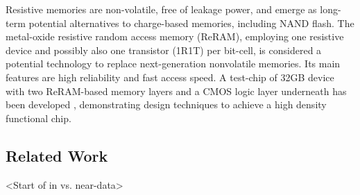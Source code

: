 \documentclass{superfri}
\begin{document}
Resistive memories are non-volatile, free of leakage power, and emerge as long-term potential alternatives to charge-based memories, including NAND flash. The metal-oxide resistive random access memory (ReRAM), employing one resistive device and possibly also one transistor (1R1T) per bit-cell, is considered a potential technology to replace next-generation nonvolatile memories. Its main features are high reliability and fast access speed. A test-chip of 32GB device with two ReRAM-based memory layers and a CMOS logic layer underneath has been developed \cite{ahn2015pim}, demonstrating design techniques to achieve a high density functional chip. 

\subsection{Related Work}
\label{sec:related_work}


<Start of in vs. near-data>
\end{document}
